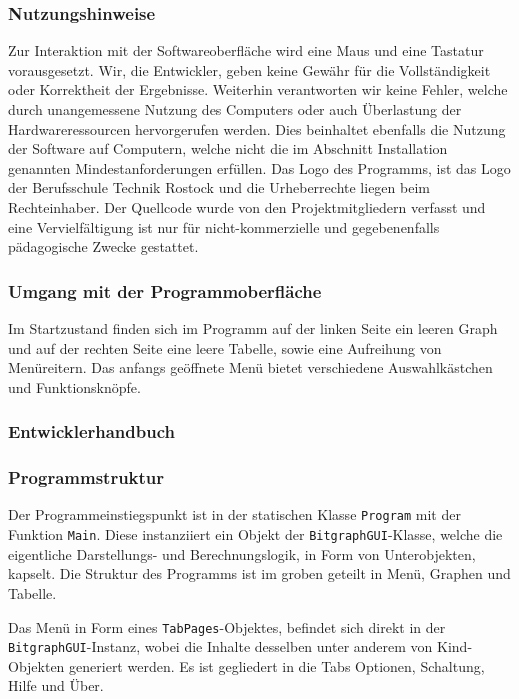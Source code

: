 \documentclass[a4paper]{article}
\begin{document}
    \subsubsection{Nutzungshinweise}
    
    Zur Interaktion mit der Softwareoberfläche wird eine Maus und eine Tastatur vorausgesetzt.
    Wir, die Entwickler, geben keine Gewähr für die Vollständigkeit oder Korrektheit der Ergebnisse.
    Weiterhin verantworten wir keine Fehler, welche durch unangemessene Nutzung des Computers oder auch Überlastung der Hardwareressourcen hervorgerufen werden.
    Dies beinhaltet ebenfalls die Nutzung der Software auf Computern, welche nicht die im Abschnitt Installation genannten Mindestanforderungen erfüllen.
    Das Logo des Programms, ist das Logo der Berufsschule Technik Rostock und die Urheberrechte liegen beim Rechteinhaber.
    Der Quellcode wurde von den Projektmitgliedern verfasst und eine Vervielfältigung ist nur für nicht-kommerzielle und gegebenenfalls pädagogische Zwecke gestattet.

    \subsubsection{Umgang mit der Programmoberfläche}
    
    Im Startzustand finden sich im Programm auf der linken Seite ein leeren Graph und auf der rechten Seite eine leere Tabelle, sowie eine Aufreihung von Menüreitern.
    Das anfangs geöffnete Menü bietet verschiedene Auswahlkästchen und Funktionsknöpfe.
    

\subsubsection{Entwicklerhandbuch}
    \subsubsection{Programmstruktur}
    
    Der Programmeinstiegspunkt ist in der statischen Klasse \verb|Program| mit der Funktion \verb|Main|.
    Diese instanziiert ein Objekt der \verb|BitgraphGUI|-Klasse, welche die eigentliche Darstellungs- und Berechnungslogik, in Form von Unterobjekten, kapselt.
    Die Struktur des Programms ist im groben geteilt in Menü, Graphen und Tabelle.

    Das Menü in Form eines \verb|TabPages|-Objektes, befindet sich direkt in der \verb|BitgraphGUI|-Instanz, wobei die Inhalte desselben unter anderem von Kind-Objekten generiert werden.
    Es ist gegliedert in die Tabs \glqq Optionen\grqq{}, \glqq Schaltung\grqq{}, \glqq Hilfe\grqq{} und \glqq Über\grqq{}.
\end{document}

